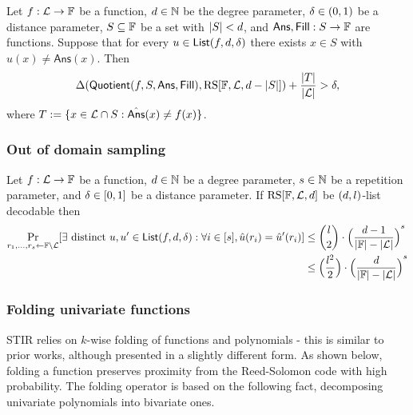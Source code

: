\begin{lemma}\label{lemma:quotienting}
    Let $f:\mathcal{L}\rightarrow\mathbb{F}$ be a function, $d\in\mathbb{N}$ be the degree parameter, $\delta\in(0,1)$
    be a distance parameter, $S\subseteq\mathbb{F}$ be a set with $|S|<d$, and $\mathsf{Ans},\mathsf{Fill}:S\rightarrow\mathbb{F}$ are functions. Suppose that for every $u\in\mathsf{List}(f,d,\delta)$ there exists $x\in S$ with $\hat{u}(x)\neq\mathsf{Ans}(x)$. Then 
    \[
            \Delta(\mathsf{Quotient}(f,S,\mathsf{Ans},\mathsf{Fill}),\mathrm{RS}[\mathbb{F},\mathcal{L},d-|S|])+\frac{|T|}{|\mathcal{L}|}>\delta,
    \]
    where $T:=\{x\in\mathcal{L}\cap S: \hat{\mathsf{Ans}}(x)\neq f(x)\}$.
\end{lemma}

\subsubsection{Out of domain sampling}\label{sec:out_of_domain_smpl}
\begin{lemma}\label{lemma:out_of_domain_smpl}
    Let $f:\mathcal{L}\rightarrow\mathbb{F}$ be a function, $d\in\mathbb{N}$ be a degree parameter, $s\in\mathbb{N}$ be a repetition parameter, and $\delta\in[0,1]$ be a distance parameter. If $\mathrm{RS}[\mathbb{F},\mathcal{L},d]$ be $(d,l)$-list decodable then
    \begin{align*}
    \Pr_{r_1,\ldots,r_s\gets\mathbb{F}\setminus\mathcal{L}}[\exists\text{ distinct }u,u'\in\mathsf{List}(f,d,\delta):\forall i\in[s],\hat{u}(r_i)=\hat{u}'(r_i)] & \leq \binom{l}{2}\cdot{\Big(\frac{d-1}{|\mathbb{F}|-|\mathcal{L}|}\Big)}^s \\
    & \leq \Big(\frac{l^2}{2}\Big)\cdot{\Big(\frac{d}{|\mathbb{F}|-|\mathcal{L}|}\Big)}^s
    \end{align*}
\end{lemma}

\subsubsection{Folding univariate functions}\label{sec:folding_uf}
STIR relies on $k$-wise folding of functions and polynomials - this is similar to prior works, although presented in a slightly different form. As shown below, folding a function preserves proximity from the Reed-Solomon code with high probability. The folding operator is based on the following fact, decomposing univariate polynomials into bivariate ones.

